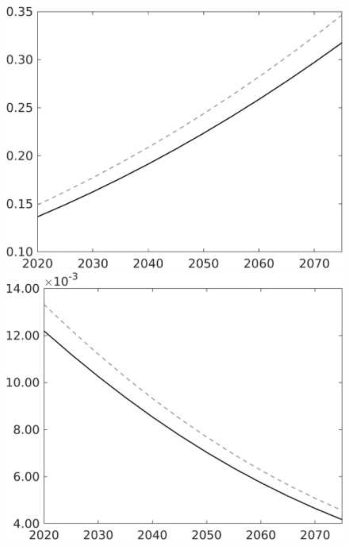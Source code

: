 \documentclass[12pt]{article}
\begin{document}
\begin{figure}[h!!]
\begin{minipage}[]{0.32\textwidth}
	\end{minipage}	
	\begin{minipage}[]{0.32\textwidth}
	\includegraphics[width=1\textwidth]{../../codding_model/own_basedOnFried/optimalPol_010922_revision/figures/all_13Sept22/CompTaul_LFBAU_Reg0_F_spillover0_nsk0_xgr1_knspil1_sep1_countec0_GovRev0_etaa0.79_lgd0.png}
\end{minipage}	
\begin{minipage}[]{0.32\textwidth}
\includegraphics[width=1\textwidth]{../../codding_model/own_basedOnFried/optimalPol_010922_revision/figures/all_13Sept22/CompTaul_LFBAU_Reg0_G_spillover0_nsk0_xgr1_knspil1_sep1_countec0_GovRev0_etaa0.79_lgd0.png}

\end{minipage}
\end{figure}
\end{document}
